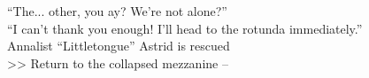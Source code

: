 “The... other\lisp , you \lisp ay? We’re not alone?”\\

“I can’t thank you enough! I’ll head to the rotunda immediately.”\\
 Annalist “Littletongue” Astrid is rescued\\

>> Return to the collapsed mezzanine -- 